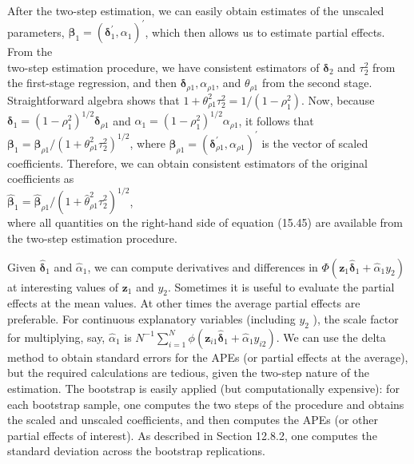 \documentclass[10pt]{article}
\begin{document}
After the two-step estimation, we can easily obtain estimates of the unscaled parameters, $\boldsymbol{\beta}_{1}=\left(\boldsymbol{\delta}_{1}^{\prime}, \alpha_{1}\right)^{\prime}$, which then allows us to estimate partial effects. From the\\
two-step estimation procedure, we have consistent estimators of $\boldsymbol{\delta}_{2}$ and $\tau_{2}^{2}$ from the first-stage regression, and then $\boldsymbol{\delta}_{\rho 1}, \alpha_{\rho 1}$, and $\theta_{\rho 1}$ from the second stage. Straightforward algebra shows that $1+\theta_{\rho 1}^{2} \tau_{2}^{2}=1 /\left(1-\rho_{1}^{2}\right)$. Now, because $\boldsymbol{\delta}_{1}=\left(1-\rho_{1}^{2}\right)^{1 / 2} \boldsymbol{\delta}_{\rho 1}$ and $\alpha_{1}=\left(1-\rho_{1}^{2}\right)^{1 / 2} \alpha_{\rho 1}$, it follows that $\boldsymbol{\beta}_{1}=\boldsymbol{\beta}_{\rho 1} /\left(1+\theta_{\rho 1}^{2} \tau_{2}^{2}\right)^{1 / 2}$, where $\boldsymbol{\beta}_{\rho 1}= \left(\boldsymbol{\delta}_{\rho 1}^{\prime}, \alpha_{\rho 1}\right)^{\prime}$ is the vector of scaled coefficients. Therefore, we can obtain consistent estimators of the original coefficients as\\
$\hat{\boldsymbol{\beta}}_{1}=\hat{\boldsymbol{\beta}}_{\rho 1} /\left(1+\hat{\theta}_{\rho 1}^{2} \hat{\tau}_{2}^{2}\right)^{1 / 2}$,\\
where all quantities on the right-hand side of equation (15.45) are available from the two-step estimation procedure.

Given $\hat{\boldsymbol{\delta}}_{1}$ and $\hat{\alpha}_{1}$, we can compute derivatives and differences in $\Phi\left(\mathbf{z}_{1} \hat{\boldsymbol{\delta}}_{1}+\hat{\alpha}_{1} y_{2}\right)$ at interesting values of $\mathbf{z}_{1}$ and $y_{2}$. Sometimes it is useful to evaluate the partial effects at the mean values. At other times the average partial effects are preferable. For continuous explanatory variables (including $y_{2}$ ), the scale factor for multiplying, say, $\hat{\alpha}_{1}$ is $N^{-1} \sum_{i=1}^{N} \phi\left(\mathbf{z}_{i 1} \hat{\boldsymbol{\delta}}_{1}+\hat{\alpha}_{1} y_{i 2}\right)$. We can use the delta method to obtain standard errors for the APEs (or partial effects at the average), but the required calculations are tedious, given the two-step nature of the estimation. The bootstrap is easily applied (but computationally expensive): for each bootstrap sample, one computes the two steps of the procedure and obtains the scaled and unscaled coefficients, and then computes the APEs (or other partial effects of interest). As described in Section 12.8.2, one computes the standard deviation across the bootstrap replications.
\end{document}

